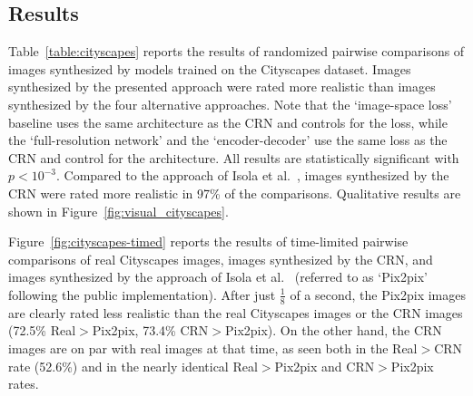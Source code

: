 

\subsection{Results}

Table~\ref{table:cityscapes} reports the results of randomized pairwise comparisons of images synthesized by models trained on the Cityscapes dataset. Images synthesized by the presented approach were rated more realistic than images synthesized by the four alternative approaches. Note that the `image-space loss' baseline uses the same architecture as the CRN and controls for the loss, while the `full-resolution network' and the `encoder-decoder' use the same loss as the CRN and control for the architecture. All results are statistically significant with $p < 10^{-3}$. Compared to the approach of Isola et al.~\cite{Isola2017}, images synthesized by the CRN were rated more realistic in 97\% of the comparisons. Qualitative results are shown in Figure~\ref{fig:visual_cityscapes}.

Figure~\ref{fig:cityscapes-timed} reports the results of time-limited pairwise comparisons of real Cityscapes images, images synthesized by the CRN, and images synthesized by the approach of Isola et al.~\cite{Isola2017} (referred to as `Pix2pix' following the public implementation). After just $\frac{1}{8}$ of a second, the Pix2pix images are clearly rated less realistic than the real Cityscapes images or the CRN images (72.5\% Real$>$Pix2pix, 73.4\% CRN$>$Pix2pix). On the other hand, the CRN images are on par with real images at that time, as seen both in the Real$>$CRN rate (52.6\%) and in the nearly identical Real$>$Pix2pix and CRN$>$Pix2pix rates.

